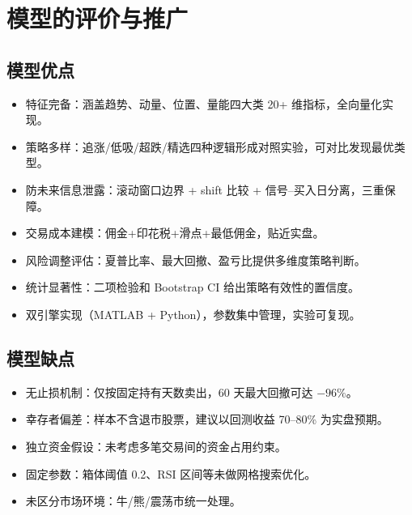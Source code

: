 \documentclass[12pt,a4paper]{ctexart}
\numberwithin{figure}{section}
\numberwithin{table}{section}
\begin{document}
\section{模型的评价与推广}

\subsection{模型优点}
\begin{itemize}[leftmargin=*]
    \item 特征完备：涵盖趋势、动量、位置、量能四大类 20+ 维指标，全向量化实现。
    \item 策略多样：追涨/低吸/超跌/精选四种逻辑形成对照实验，可对比发现最优类型。
    \item 防未来信息泄露：滚动窗口边界 + shift 比较 + 信号--买入日分离，三重保障。
    \item 交易成本建模：佣金+印花税+滑点+最低佣金，贴近实盘。
    \item 风险调整评估：夏普比率、最大回撤、盈亏比提供多维度策略判断。
    \item 统计显著性：二项检验和 Bootstrap CI 给出策略有效性的置信度。
    \item 双引擎实现（MATLAB + Python），参数集中管理，实验可复现。
\end{itemize}

\subsection{模型缺点}
\begin{itemize}[leftmargin=*]
    \item 无止损机制：仅按固定持有天数卖出，60 天最大回撤可达 $-96\%$。
    \item 幸存者偏差：样本不含退市股票，建议以回测收益 70--80\% 为实盘预期。
    \item 独立资金假设：未考虑多笔交易间的资金占用约束。
    \item 固定参数：箱体阈值 0.2、RSI 区间等未做网格搜索优化。
    \item 未区分市场环境：牛/熊/震荡市统一处理。
\end{itemize}
\end{document}
